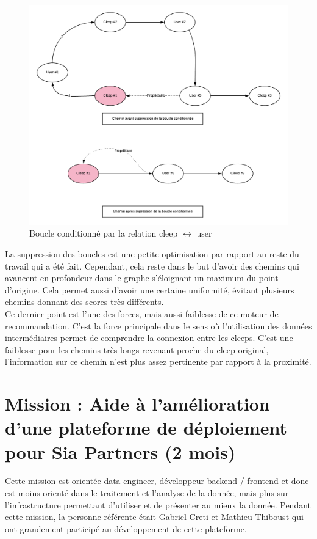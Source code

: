 \documentclass{article} %
\begin{document}
\begin{figure}[!h]
	\centering
	\includegraphics[keepaspectratio = true,scale=0.6]{bbb}
	\caption{Boucle conditionné par la relation cleep $\leftrightarrow$ user}
	\label{fig:bbb}
\end{figure}

La suppression des boucles est une petite optimisation par rapport au reste du travail qui a été fait. Cependant, cela reste dans le but d'avoir des chemins qui avancent en profondeur dans le graphe s'éloignant un maximum du point d'origine. Cela permet aussi d'avoir une certaine uniformité, évitant plusieurs chemins donnant des scores très différents.\\
Ce dernier point est l'une des forces, mais aussi faiblesse de ce moteur de recommandation. C'est la force principale dans le sens où l'utilisation des données intermédiaires permet de comprendre la connexion entre les cleeps. C'est une faiblesse pour les chemins très longs revenant proche du cleep original, l'information sur ce chemin n'est plus assez pertinente par rapport à la proximité.

\newpage

\section{Mission : Aide à l'amélioration d'une plateforme de déploiement pour Sia Partners (2 mois)}
Cette mission est orientée data engineer, développeur backend / frontend et donc est moins orienté dans le traitement et l'analyse de la donnée, mais plus sur l'infrastructure permettant d'utiliser et de présenter au mieux la donnée. Pendant cette mission, la personne référente était Gabriel Creti et Mathieu Thiboust qui ont grandement participé au développement de cette plateforme.
 
\end{document}
